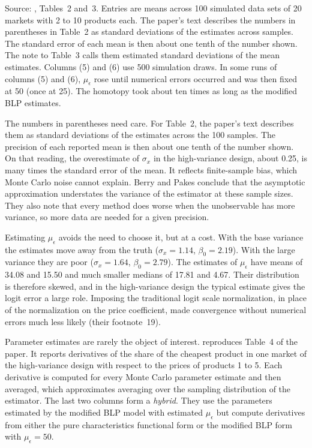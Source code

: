 \begin{table}[htbp]
\smallskip
\begin{minipage}{0.95\textwidth}
\footnotesize Source: \citet{BerryPakes2007}, Tables~2 and~3. Entries are means across 100 simulated data sets of 20
markets with 2 to 10 products each. The paper's text describes the numbers in parentheses in Table~2 as standard
deviations of the estimates across samples. The standard error of each mean is then about one tenth of the number shown.
The note to Table~3 calls them estimated standard deviations of the mean estimates. Columns (5) and (6) use 500
simulation draws. In some runs of columns (5) and (6), $\mu_\epsilon$ rose until numerical errors occurred and was then
fixed at 50 (once at 25). The homotopy took about ten times as long as the modified BLP estimates.
\end{minipage}
\end{table}

The numbers in parentheses need care. For Table~2, the paper's text describes them as standard deviations of the
estimates across the 100 samples. The precision of each reported mean is then about one tenth of the number shown. On that
reading, the overestimate of $\sigma_x$ in the high-variance design, about 0.25, is many times the standard error of the
mean. It reflects finite-sample bias, which Monte Carlo noise cannot explain. Berry and Pakes conclude that the asymptotic approximation
understates the variance of the estimator at these sample sizes. They also note that every method does worse when the
unobservable has more variance, so more data are needed for a given precision.

Estimating $\mu_\epsilon$ avoids the need to choose it, but at a cost. With the base variance the estimates move away
from the truth ($\sigma_x = 1.14$, $\beta_0 = 2.19$). With the large variance they are poor ($\sigma_x = 1.64$, $\beta_0 =
2.79$). The estimates of $\mu_\epsilon$ have means of 34.08 and 15.50 and much smaller medians of 17.81 and 4.67. Their
distribution is therefore skewed, and in the high-variance design the typical estimate gives the logit error a large role.
Imposing the traditional logit scale normalization, in place of the normalization on the price coefficient, made
convergence without numerical errors much less likely (their footnote~19).

Parameter estimates are rarely the object of interest.  reproduces Table~4 of the paper. It reports
derivatives of the share of the cheapest product in one market of the high-variance design with respect to the prices of
products 1 to 5. Each derivative is computed for every Monte Carlo parameter estimate and then averaged, which
approximates averaging over the sampling distribution of the estimator. The last two columns form a \emph{hybrid}. They
use the parameters estimated by the modified BLP model with estimated $\mu_\epsilon$ but compute derivatives from either
the pure characteristics functional form or the modified BLP form with $\mu_\epsilon = 50$.

